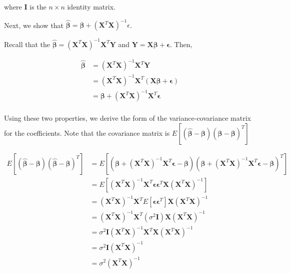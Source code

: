 \documentclass[]{book}
\begin{document}
where \(\mathbf{I}\) is the \(n \times n\) identity matrix.

Next, we show that
\(\hat{\boldsymbol{\beta}} = \boldsymbol{\beta} + (\mathbf{X}^T\mathbf{X})^{-1}\epsilon\).

Recall that the
\(\hat{\boldsymbol{\beta}} = (\mathbf{X}^T\mathbf{X})^{-1}\mathbf{X}^T\mathbf{Y}\)
and \(\mathbf{Y} = \mathbf{X}\mathbf{\beta} + \mathbf{\epsilon}\). Then,

\begin{equation}
\begin{aligned}
\hat{\boldsymbol{\beta}} &= (\mathbf{X}^T\mathbf{X})^{-1}\mathbf{X}^T\mathbf{Y} \\[10pt]
&= (\mathbf{X}^T\mathbf{X})^{-1}\mathbf{X}^T(\mathbf{X}\boldsymbol{\beta} + \boldsymbol{\epsilon}) \\[10pt]
&= \boldsymbol{\beta} + (\mathbf{X}^T\mathbf{X})^{-1}\mathbf{X}^T \mathbf{\epsilon} \\
\end{aligned}
\end{equation}

Using these two properties, we derive the form of the
variance-covariance matrix for the coefficients. Note that the
covariance matrix is
\(E[(\hat{\boldsymbol{\beta}} - \boldsymbol{\beta})(\hat{\boldsymbol{\beta}} - \boldsymbol{\beta})^T]\)

\begin{equation}
\begin{aligned}
E[(\hat{\boldsymbol{\beta}} - \boldsymbol{\beta})(\hat{\boldsymbol{\beta}} - \boldsymbol{\beta})^T] &= E[(\boldsymbol{\beta} + (\mathbf{X}^T\mathbf{X})^{-1} \mathbf{X}^T \boldsymbol{\epsilon} - \boldsymbol{\beta})(\boldsymbol{\beta} + (\mathbf{X}^T\mathbf{X})^{-1} \mathbf{X}^T \boldsymbol{\epsilon} - \boldsymbol{\beta})^T]\\[10pt]
& = E[(\mathbf{X}^T\mathbf{X})^{-1} \mathbf{X}^T \boldsymbol{\epsilon}\boldsymbol{\epsilon}^T\mathbf{X}(\mathbf{X}^T\mathbf{X})^{-1}] \\[10pt]
& = (\mathbf{X}^T\mathbf{X})^{-1} \mathbf{X}^T E[\boldsymbol{\epsilon}\boldsymbol{\epsilon}^T]\mathbf{X}(\mathbf{X}^T\mathbf{X})^{-1}\\[10pt]
& = (\mathbf{X}^T\mathbf{X})^{-1} \mathbf{X}^T (\sigma^2\mathbf{I})\mathbf{X}(\mathbf{X}^T\mathbf{X})^{-1}\\
&= \sigma^2\mathbf{I}(\mathbf{X}^T\mathbf{X})^{-1}\mathbf{X}^T\mathbf{X}(\mathbf{X}^T\mathbf{X})^{-1}\\[10pt]
& = \sigma^2\mathbf{I}(\mathbf{X}^T\mathbf{X})^{-1}\\[10pt]
&  = \sigma^2(\mathbf{X}^T\mathbf{X})^{-1} \\
\end{aligned}
\end{equation}
\end{document}
